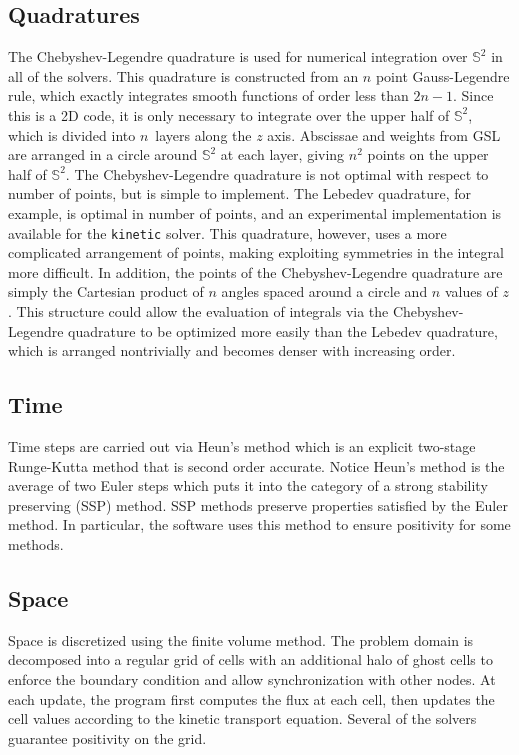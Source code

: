 \documentclass{article}
\newcommand{\twosphere}{\ensuremath{\mathbb{S}^2}\xspace}
\newcommand{\kinetic}{\texttt{kinetic}\xspace}
\begin{document}
\subsection{Quadratures}
\label{subsec:quadratures}
The Chebyshev-Legendre quadrature \cite{atkinson-1982} is used for numerical integration over
\twosphere in all of the solvers. This quadrature is constructed from an
$n$ point Gauss-Legendre rule, which exactly integrates smooth functions of
order less than $2n-1$. Since this is a 2D code, it is only necessary
to integrate over the upper half of \twosphere, which is divided into
$n$~layers along the $z$ axis. Abscissae and weights from GSL are arranged
in a circle around \twosphere at each layer, giving $n^2$ points on the
upper half of \twosphere. The Chebyshev-Legendre quadrature is not optimal
with respect to number of points, but is simple to implement. The Lebedev
quadrature, for example, is optimal in number of points, and an experimental
implementation is available for the \kinetic solver. This quadrature, however,
uses a more complicated arrangement of points, making exploiting symmetries
in the integral more difficult. In addition, the points of the
Chebyshev-Legendre quadrature are simply the Cartesian product of $n$ angles
spaced around a circle and $n$ values of $z$. This structure could allow the
evaluation of integrals via the Chebyshev-Legendre quadrature to be optimized
more easily than the Lebedev quadrature, which is arranged nontrivially and
becomes denser with increasing order.

\subsection{Time}
Time steps are carried out via Heun's method which is an explicit two-stage Runge-Kutta method that is second order accurate. 
Notice Heun's method is the average of two Euler steps which puts it into the category of a strong stability preserving (SSP) method.
SSP methods preserve properties satisfied by the Euler method.
In particular, the software uses this method to ensure positivity for some methods.

\subsection{Space}
Space is discretized using the finite volume method. The problem domain is
decomposed into a regular grid of cells with an additional halo of ghost cells
to enforce the boundary condition and allow synchronization with other nodes.
At each update, the program first computes the flux at each cell, then updates
the cell values according to the kinetic transport equation. Several of the
solvers guarantee positivity on the grid.
\end{document}
